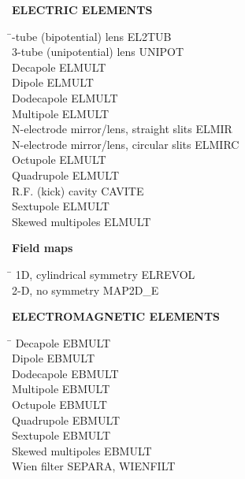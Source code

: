 \noindent\textbf{ELECTRIC ELEMENTS}  
\smallskip

\begin{tabbing}
\hspace*{7cm} \= -tube (bipotential) lens \> EL2TUB \\
  3-tube (unipotential) lens \> UNIPOT \\
  Decapole                \> ELMULT \\
  Dipole                  \> ELMULT \\
  Dodecapole              \> ELMULT \\
  Multipole               \> ELMULT \\
  N-electrode mirror/lens, straight slits            \> ELMIR \\
  N-electrode mirror/lens, circular slits            \> ELMIRC \\
  Octupole                \> ELMULT \\
  Quadrupole              \> ELMULT \\
  R.F. (kick) cavity             \> CAVITE \\
  Sextupole               \> ELMULT \\
  Skewed multipoles       \> ELMULT 
\end{tabbing}
\bigskip



\newpage


\noindent\textbf{Field maps} 
\smallskip

\begin{tabbing}
\hspace*{7cm} \= \kill
 1D, cylindrical symmetry  \> ELREVOL  \\
  2-D, no symmetry          \> MAP2D\_E 
\end{tabbing}

\noindent\textbf{ELECTROMAGNETIC ELEMENTS}  
\smallskip

\begin{tabbing}
\hspace*{7cm} \= \kill
  Decapole                \> EBMULT \\
  Dipole                  \> EBMULT \\
  Dodecapole              \> EBMULT \\
  Multipole               \> EBMULT \\
  Octupole                \> EBMULT \\
  Quadrupole              \> EBMULT \\
  Sextupole               \> EBMULT \\
  Skewed multipoles       \> EBMULT \\
  Wien filter             \> SEPARA, WIENFILT 
\end{tabbing} 

